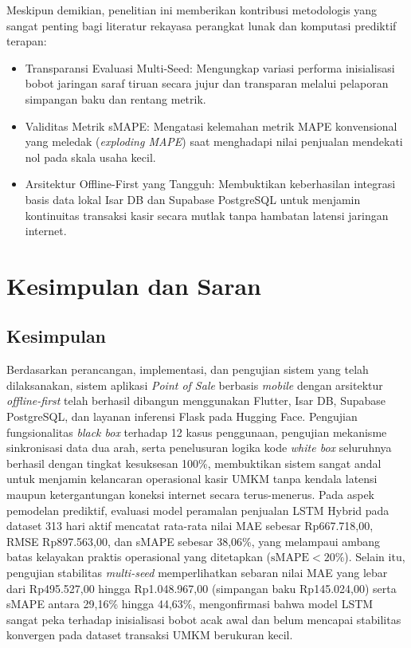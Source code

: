 \documentclass[10pt,a4paper]{article}
\begin{document}
Meskipun demikian, penelitian ini memberikan kontribusi metodologis yang sangat penting bagi literatur rekayasa perangkat lunak dan komputasi prediktif terapan:
\begin{itemize}
  \item Transparansi Evaluasi Multi-Seed: Mengungkap variasi performa inisialisasi bobot jaringan saraf tiruan secara jujur dan transparan melalui pelaporan simpangan baku dan rentang metrik.
  \item Validitas Metrik sMAPE: Mengatasi kelemahan metrik MAPE konvensional yang meledak (\textit{exploding MAPE}) saat menghadapi nilai penjualan mendekati nol pada skala usaha kecil.
  \item Arsitektur Offline-First yang Tangguh: Membuktikan keberhasilan integrasi basis data lokal Isar DB dan Supabase PostgreSQL untuk menjamin kontinuitas transaksi kasir secara mutlak tanpa hambatan latensi jaringan internet.
\end{itemize}

\FloatBarrier
\section{Kesimpulan dan Saran}

\subsection{Kesimpulan}
Berdasarkan perancangan, implementasi, dan pengujian sistem yang telah dilaksanakan, sistem aplikasi \textit{Point of Sale} berbasis \textit{mobile} dengan arsitektur \textit{offline-first} telah berhasil dibangun menggunakan Flutter, Isar DB, Supabase PostgreSQL, dan layanan inferensi Flask pada Hugging Face. Pengujian fungsionalitas \textit{black box} terhadap 12 kasus penggunaan, pengujian mekanisme sinkronisasi data dua arah, serta penelusuran logika kode \textit{white box} seluruhnya berhasil dengan tingkat kesuksesan 100\%, membuktikan sistem sangat andal untuk menjamin kelancaran operasional kasir UMKM tanpa kendala latensi maupun ketergantungan koneksi internet secara terus-menerus. Pada aspek pemodelan prediktif, evaluasi model peramalan penjualan LSTM Hybrid pada dataset 313 hari aktif mencatat rata-rata nilai MAE sebesar Rp667.718,00, RMSE Rp897.563,00, dan sMAPE sebesar 38,06\%, yang melampaui ambang batas kelayakan praktis operasional yang ditetapkan ($\text{sMAPE} < 20\%$). Selain itu, pengujian stabilitas \textit{multi-seed} memperlihatkan sebaran nilai MAE yang lebar dari Rp495.527,00 hingga Rp1.048.967,00 (simpangan baku Rp145.024,00) serta sMAPE antara 29,16\% hingga 44,63\%, mengonfirmasi bahwa model LSTM sangat peka terhadap inisialisasi bobot acak awal dan belum mencapai stabilitas konvergen pada dataset transaksi UMKM berukuran kecil.
\end{document}
